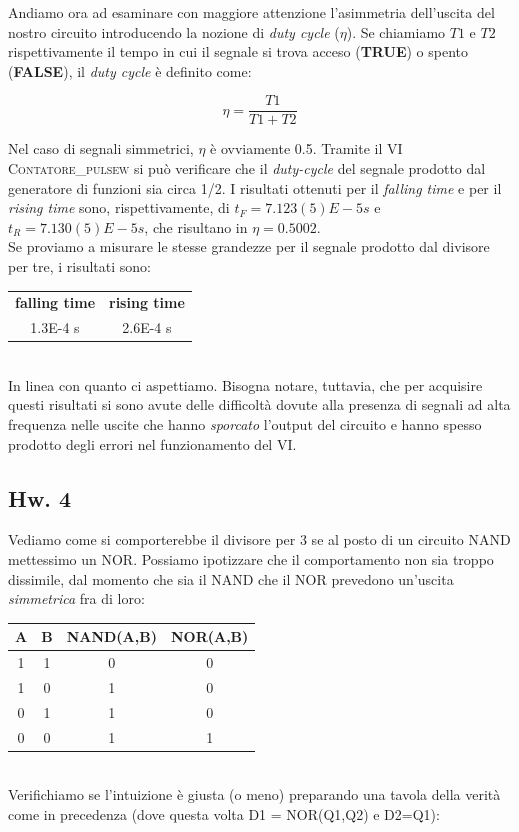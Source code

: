 \documentclass[journal, a4paper]{IEEEtran}
\begin{document}
Andiamo ora ad esaminare con maggiore attenzione l'asimmetria dell'uscita del nostro circuito introducendo la nozione di \textit{duty cycle} ($\eta$). Se chiamiamo $T1$ e $T2$ rispettivamente il tempo in cui il segnale si trova acceso (\textbf{TRUE}) o spento (\textbf{FALSE}), il \textit{duty cycle} è definito come:

\begin{equation}
\eta = \frac{T1}{T1 + T2}
\end{equation}

Nel caso di segnali simmetrici, $\eta$ è ovviamente 0.5. Tramite il VI \textsc{Contatore\_pulsew} si può verificare che il \textit{duty-cycle} del segnale prodotto dal generatore di funzioni sia circa 1/2. I risultati ottenuti per il \textit{falling time} e per il \textit{rising time} sono, rispettivamente, di $t_F = 7.123(5)E-5 s$ e $t_R = 7.130(5)E-5 s$, che risultano in $\eta = 0.5002$.\\
Se proviamo a misurare le stesse grandezze per il segnale prodotto dal divisore per tre, i risultati sono: 

\begin{table}[h]
\centering
\begin{tabular}{c|c}
\hline \textbf{falling time} & \textbf{rising time} \\ 
 1.3E-4 s & 2.6E-4 s \\ 
\hline 
\end{tabular}   
\end{table}
~\\
In linea con quanto ci aspettiamo. Bisogna notare, tuttavia, che per acquisire questi risultati si sono avute delle difficoltà dovute alla presenza di segnali ad alta frequenza nelle uscite che hanno \textit{sporcato} l'output del circuito e hanno spesso prodotto degli errori nel funzionamento del VI. 

\subsection{Hw. 4}
Vediamo come si comporterebbe il divisore per 3 se al posto di un circuito \textsc{NAND} mettessimo un \textsc{NOR}. Possiamo ipotizzare che il comportamento non sia troppo dissimile, dal momento che sia il \textsc{NAND} che il \textsc{NOR} prevedono un'uscita \textit{simmetrica} fra di loro:

\begin{table}[h]
\centering
\begin{tabular}{c|c||c|c}
\hline \textbf{A} & \textbf{B} & \textbf{NAND(A,B)} & \textbf{NOR(A,B)} \\ 
\hline 1 & 1 & 0 & 0 \\ 
 1 & 0 & 1 & 0 \\ 
 0 & 1 & 1 & 0 \\ 
 0 & 0 & 1 & 1 \\ 
\hline
 
\end{tabular} 
\end{table}
~\\
Verifichiamo se l'intuizione è giusta (o meno) preparando una tavola della verità come in precedenza (dove questa volta D1 = NOR(Q1,Q2) e D2=Q1):
\end{document}
